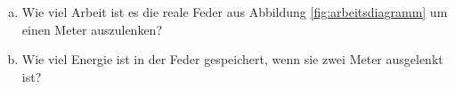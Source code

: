
\begin{aufgabe}
	\begin{enumerate}[a)]
		\item	Wie viel Arbeit ist es die reale Feder aus Abbildung \ref{fig:arbeitsdiagramm} um einen Meter auszulenken?
		\item Wie viel Energie ist in der Feder gespeichert, wenn sie zwei Meter ausgelenkt ist?
	\end{enumerate}
\end{aufgabe}
